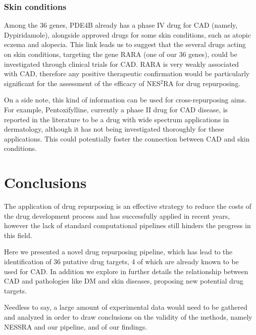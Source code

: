 \documentclass[fleqn,10pt]{SelfArx} %
\begin{document}
\subsubsection*{Skin conditions}

Among the 36 genes, PDE4B already has a phase IV drug for CAD (namely, Dypiridamole), alongside approved drugs for some skin conditions, such as atopic eczema and alopecia. This link leads us to suggest that the several drugs acting on skin conditions, targeting the gene RARA (one of our 36 genes), could be investigated through clinical trials for CAD. RARA is very weakly associated with CAD, therefore any positive therapeutic confirmation would be particularly significant for the assessment of the efficacy of NES$^2$RA for drug repurposing.

On a side note, this kind of information can be used for cross-repurposing aims. For example, Pentoxifylline, currently a phase II drug for CAD disease, is reported in the literature to be a drug with wide spectrum applications in dermatology, although it has not being investigated thoroughly for these applications. \cite{pento} This could potentially foster the connection between CAD and skin conditions.

\section*{Conclusions}

The application of drug repurposing is an effective strategy to reduce the costs of the drug development process and has successfully applied in recent years, however the lack of standard computational pipelines still hinders the progress in this field.

Here we presented a novel drug repurposing pipeline, which has lead to the identification of 36 putative drug targets, 4 of which are already known to be used for CAD. In addition we explore in further details the relationship between CAD and pathologies like DM and skin diseases, proposing new potential drug targets.

Needless to say, a large amount of experimental data would need to be gathered and analyzed in order to draw conclusions on the validity of the methods, namely NESSRA and our pipeline, and of our findings.
\end{document}
